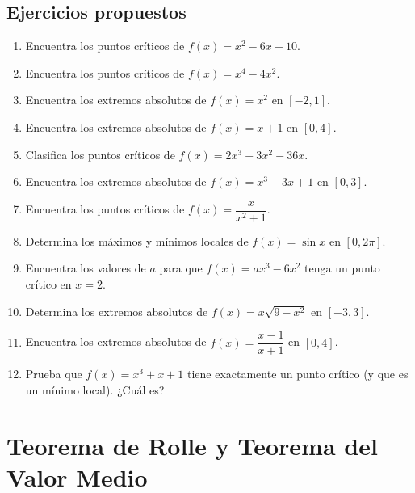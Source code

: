\documentclass[12pt, letterpaper]{article}
\begin{document}
\subsection{Ejercicios propuestos}

\begin{enumerate}[series=ejercicios, leftmargin=*]
  \item \facil{} Encuentra los puntos críticos de $f(x) = x^2 - 6x + 10$.

  \item \facil{} Encuentra los puntos críticos de $f(x) = x^4 - 4x^2$.

  \item \facil{} Encuentra los extremos absolutos de $f(x) = x^2$ en $[-2, 1]$.

  \item \facil{} Encuentra los extremos absolutos de $f(x) = x + 1$ en $[0, 4]$.

  \item \medio{} Clasifica los puntos críticos de $f(x) = 2x^3 - 3x^2 - 36x$.

  \item \medio{} Encuentra los extremos absolutos de $f(x) = x^3 - 3x + 1$ en $[0, 3]$.

  \item \medio{} Encuentra los puntos críticos de $f(x) = \dfrac{x}{x^2 + 1}$.

  \item \medio{} Determina los máximos y mínimos locales de $f(x) = \sin x$ en $[0, 2\pi]$.

  \item \dificil{} Encuentra los valores de $a$ para que $f(x) = ax^3 - 6x^2$ tenga un punto crítico en $x = 2$.

  \item \dificil{} Determina los extremos absolutos de $f(x) = x\sqrt{9 - x^2}$ en $[-3, 3]$.

  \item \dificil{} Encuentra los extremos absolutos de $f(x) = \dfrac{x - 1}{x + 1}$ en $[0, 4]$.

  \item \dificil{} Prueba que $f(x) = x^3 + x + 1$ tiene exactamente un punto crítico (y que es un mínimo local). ¿Cuál es?
\end{enumerate}


\section{Teorema de Rolle y Teorema del Valor Medio}
\end{document}
